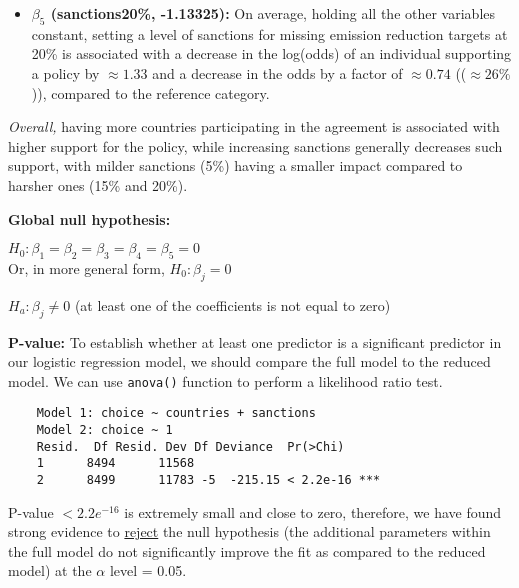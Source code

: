 \documentclass[12pt,letterpaper]{article}
\begin{document}
\begin{enumerate}
\begin{enumerate}
\begin{itemize}
	\item \textbf{\( \beta_5 \) (sanctions20\%, -1.13325): }On average, holding all the other variables constant, setting a level of  sanctions for missing emission reduction targets at 20\% is associated with a decrease in the log(odds) of an individual supporting a policy by $\approx 1.33$ and a decrease in the odds by a factor of $\approx 0.74$ (($\approx 26\%$)), compared to the reference category.
\end{itemize}

\textit{Overall, }having more countries participating in the agreement is associated with higher support for the policy, while
increasing sanctions  generally decreases such support, with milder sanctions (5\%) having a smaller impact compared to harsher ones (15\% and 20\%).


\vspace{.25cm}
\textbf{Global null hypothesis:}

$H_0: \beta_1 = \beta_2 = \beta_3 = \beta_4 = \beta_5 = 0$ \\
Or, in more general form, $H_0: \beta_j  = 0$

$H_a: \beta_j \neq 0$ (at least one of the coefficients is not equal to zero)

\vspace{.25cm}
\textbf{P-value:}
To establish whether at least one predictor is a significant predictor in our logistic regression model, we should compare the full model to the reduced model. We can use \texttt{anova()} function to perform a likelihood ratio test.

	 
	
\begin{verbatim}
	Model 1: choice ~ countries + sanctions
	Model 2: choice ~ 1
	Resid.  Df Resid. Dev Df Deviance  Pr(>Chi)    
	1      8494      11568                          
	2      8499      11783 -5  -215.15 < 2.2e-16 ***
\end{verbatim}

P-value \textbf{$< 2.2e^{-16}$ }is extremely small and close to zero, therefore, we have found strong evidence to \underline{reject} the null hypothesis (the additional parameters within the full model do not significantly improve the fit as compared to the reduced model) at the $\alpha$ level = 0.05.
\vspace{.25cm}

	\end{enumerate}
	

\end{enumerate}
\end{document}
